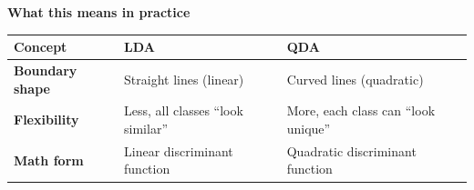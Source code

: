 \highspace
\begin{flushleft}
    \textcolor{Green3}{ \textbf{What this means in practice}}
\end{flushleft}
\begin{table}[!htp]
    \centering
    \begin{adjustbox}{width={\textwidth},totalheight={\textheight},keepaspectratio}
        \begin{tabular}{@{} l l l @{}}
            \toprule
            Concept & LDA & QDA \\
            \midrule
            \textbf{Boundary shape} & Straight lines (linear)               & Curved lines (quadratic)              \\ [.3em]
            \textbf{Flexibility}    & Less, all classes ``look similar''    & More, each class can ``look unique''  \\ [.3em]
            \textbf{Math form}      & Linear discriminant function          & Quadratic discriminant function       \\
            \bottomrule
        \end{tabular}
    \end{adjustbox}
\end{table}

\newpage

